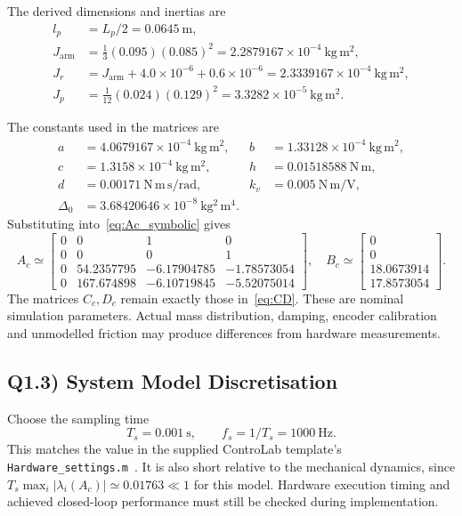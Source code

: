 \documentclass[11pt,a4paper]{article}
\begin{document}
\begin{samepage}
The derived dimensions and inertias are
\begin{align}
l_p&=L_p/2=0.0645~\mathrm m,\\
J_{\mathrm{arm}}&=\tfrac13(0.095)(0.085)^2
=2.2879167\times10^{-4}~\mathrm{kg\,m^2},\\
J_r&=J_{\mathrm{arm}}+4.0\times10^{-6}+0.6\times10^{-6}
=2.3339167\times10^{-4}~\mathrm{kg\,m^2},\\
J_p&=\tfrac1{12}(0.024)(0.129)^2
=3.3282\times10^{-5}~\mathrm{kg\,m^2}.
\end{align}
\end{samepage}
The constants used in the matrices are
\begin{align}
a&=4.0679167\times10^{-4}~\mathrm{kg\,m^2},&
b&=1.33128\times10^{-4}~\mathrm{kg\,m^2},\\
c&=1.3158\times10^{-4}~\mathrm{kg\,m^2},&
h&=0.01518588~\mathrm{N\,m},\\
d&=0.00171~\mathrm{N\,m\,s/rad},&
k_v&=0.005~\mathrm{N\,m/V},\\
\Delta_0&=3.68420646\times10^{-8}~\mathrm{kg^2\,m^4}.&&
\end{align}
Substituting into~\eqref{eq:Ac_symbolic} gives
\begin{equation}\label{eq:Ac_numeric}
A_c\simeq
\begin{bmatrix}
0&0&1&0\\0&0&0&1\\
0&54.2357795&-6.17904785&-1.78573054\\
0&167.674898&-6.10719845&-5.52075014
\end{bmatrix},\quad
B_c\simeq\begin{bmatrix}0\\0\\18.0673914\\17.8573054\end{bmatrix}.
\end{equation}
The matrices $C_c,D_c$ remain exactly those in~\eqref{eq:CD}.
These are nominal simulation parameters. Actual mass distribution, damping,
encoder calibration and unmodelled friction may produce differences from
hardware measurements.

\subsection*{Q1.3) System Model Discretisation}

Choose the sampling time
\begin{equation}
\boxed{T_s=0.001~\mathrm s,\qquad f_s=1/T_s=1000~\mathrm{Hz}.}
\end{equation}
This matches the value in the supplied ControLab template's
\texttt{Hardware\_settings.m}~\cite{hardware_template}. It is also short
relative to the mechanical dynamics, since
$T_s\max_i|\lambda_i(A_c)|\simeq0.01763\ll1$ for this model. Hardware execution timing
and achieved closed-loop performance must still be checked during
implementation.
\end{document}
